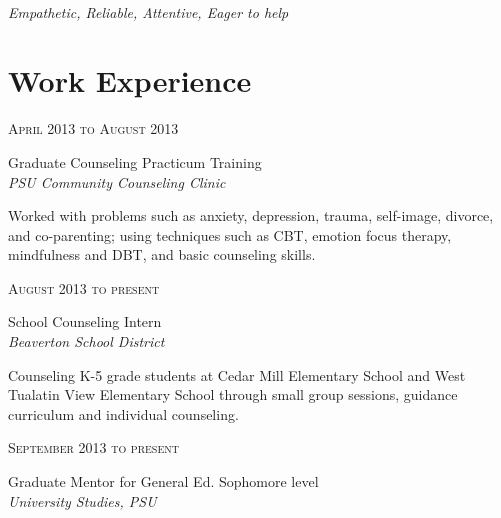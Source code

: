 \documentclass[10pt]{article} %
\begin{document}
\color{text1} %

\par{\\ %
{\color{headings} 
\textit{Empathetic, Reliable, Attentive, Eager to help}
 \\[15pt]\par} %
	

\begin{minipage}[t]{0.5\textwidth} %
\vspace{0pt} %
	
\section{Work Experience} 

{\raggedleft\textsc{April 2013 to August 2013}\par}

{\raggedright\large Graduate Counseling Practicum Training\\
\textit{PSU Community Counseling Clinic}\\[5pt]}

\normalsize{
Worked with problems such as anxiety, depression, trauma, self-image, divorce, and co-parenting; using techniques such as CBT, emotion focus therapy, mindfulness and DBT, and basic counseling skills.
}\\

{\raggedleft\textsc{August 2013 to present}\par}

{\raggedright\large School Counseling Intern\\
\textit{Beaverton School District}\\[5pt]}

\normalsize{
Counseling K-5 grade students at Cedar Mill Elementary School and West Tualatin View Elementary School through small group sessions, guidance curriculum and individual counseling. 
}\\

{\raggedleft\textsc{September 2013 to present}\par}

{\raggedright\large Graduate Mentor for General Ed. Sophomore level \\
\textit{University Studies, PSU}\\[5pt]}


\end{minipage}}
\end{document}
